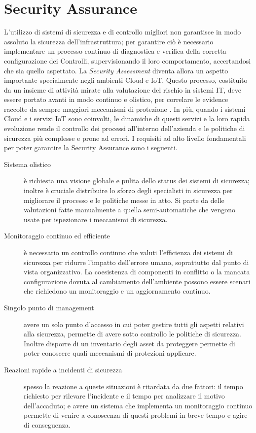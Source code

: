 \section{Security Assurance}
L'utilizzo di sistemi di sicurezza e di controllo migliori non garantisce in modo assoluto la sicurezza dell'infrastruttura; 
per garantire ciò è necessario implementare un processo continuo di diagnostica e verifica della corretta configurazione dei Controlli, 
supervisionando il loro comportamento, accertandosi che sia quello aspettato. \vspace{0.5 cm}\hfill\break
La \textit{Security Assessment} diventa allora un aspetto importante specialmente negli ambienti Cloud e IoT. Questo processo, costituito
da un insieme di attività mirate alla valutazione del rischio in sistemi IT, deve essere portato avanti in modo continuo e olistico, per 
correlare le evidence raccolte da sempre maggiori meccanismi di protezione \cite{mooncloud-semi-automatic-and-trustworthy}.\hfill\break
In più, quando i sistemi Cloud e i servizi IoT sono coinvolti, le dinamiche di questi servizi e la loro rapida evoluzione rende il 
controllo dei processi all'interno dell'azienda e le politiche di sicurezza più complesse e prone ad errori. \vspace{0.5 cm}\hfill\break
I requisiti ad alto livello fondamentali per poter garantire la Security Assurance sono i seguenti.
\begin{description}
    \item[Sistema olistico] è richiesta una visione globale e pulita dello status dei sistemi di sicurezza; inoltre è cruciale 
    distribuire lo sforzo degli specialisti in sicurezza per migliorare il processo e le politiche messe in atto. Si parte da 
    delle valutazioni fatte manualmente a quella semi-automatiche che vengono usate per ispezionare i meccanismi di sicurezza. 
    \item[Monitoraggio continuo ed efficiente] è necessario un controllo continuo che valuti l'efficienza dei sistemi di sicurezza 
    per ridurre l'impatto dell'errore umano, soprattutto dal punto di vista organizzativo. La coesistenza di componenti in conflitto o
    la mancata configurazione dovuta al cambiamento dell'ambiente possono essere scenari che richiedono un monitoraggio e un 
    aggiornamento continuo.
    \item[Singolo punto di management] avere un solo punto d'accesso in cui poter gestire tutti gli aspetti relativi alla sicurezza, 
    permette di avere sotto controllo le politiche di sicurezza. Inoltre disporre di un inventario degli asset da proteggere permette di
    poter conoscere quali meccanismi di protezioni applicare.
    \item[Reazioni rapide a incidenti di sicurezza] spesso la reazione a queste situazioni è ritardata da due fattori: il tempo 
    richiesto per rilevare l'incidente e il tempo per analizzare il motivo dell'accaduto; e avere un sistema che implementa un monitoraggio
    continuo permette di venire a conoscenza di questi problemi in breve tempo e agire di conseguenza.
    \label{list:security-assurance-fondamentals}
\end{description}
%
